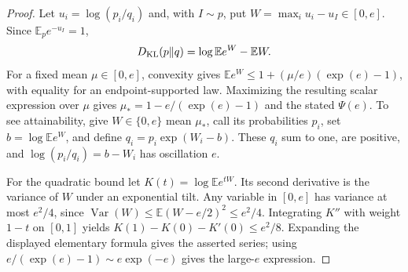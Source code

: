 \begin{proof}
Let $u_i=\log(p_i/q_i)$ and, with $I\sim p$, put
$W=\max_i u_i-u_I\in[0,e]$. Since $\mathbb E_p e^{-u_I}=1$,
\[
 D_{\rm KL}(p\|q)=\log\mathbb E e^W-\mathbb EW.
\]
For a fixed mean $\mu\in[0,e]$, convexity gives
$\mathbb E e^W\le1+(\mu/e)(\exp(e)-1)$, with equality for an
endpoint-supported law. Maximizing the resulting scalar expression
over $\mu$ gives $\mu_*=1-e/(\exp(e)-1)$ and the stated $\Psi(e)$.
To see attainability, give $W\in\{0,e\}$ mean $\mu_*$, call its
probabilities $p_i$, set $b=\log\mathbb E e^W$, and define
$q_i=p_i\exp(W_i-b)$. These $q_i$ sum to one, are positive, and
$\log(p_i/q_i)=b-W_i$ has oscillation $e$.

For the quadratic bound let $K(t)=\log\mathbb E e^{tW}$.
Its second derivative is the variance of $W$ under an exponential
tilt. Any variable in $[0,e]$ has variance at most $e^2/4$, since
$\operatorname{Var}(W)\le\mathbb E(W-e/2)^2\le e^2/4$.
Integrating $K''$ with weight $1-t$ on $[0,1]$ yields
$K(1)-K(0)-K'(0)\le e^2/8$.
Expanding the displayed elementary formula gives the asserted series;
using $e/(\exp(e)-1)\sim e\exp(-e)$ gives the large-$e$ expression.
\end{proof}
